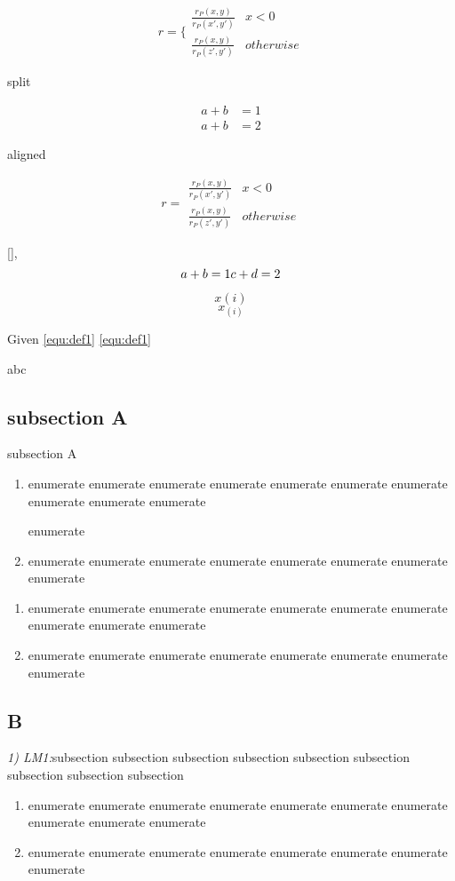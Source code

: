 \documentclass[journal]{IEEEtran}
\begin{document}
\[r=\{ \begin{array}{cc}
      \frac{r_{P}(x,y)}{r_{P}({x}',{y}')} & x<0 \\
      \frac{r_{P}(x,y)}{r_{P}({z}',{y}')} & otherwise
    \end{array}\]
    

split

\[\begin{split}
   a+b&=1 \\
   a+b&=2
\end{split}\]


aligned

\begin{equation}
  r= \begin{aligned}
      \frac{r_{P}(x,y)}{r_{P}({x}',{y}')} & x<0 \\
      \frac{r_{P}(x,y)}{r_{P}({z}',{y}')} & otherwise
    \end{aligned}
\end{equation}


[],
\[ a+b=1 \\ c+d=2 \]

$$ x(i) $$
$$ x_{(i)} $$

Given \eqref{equ:def1} \eqref{equ:def1}

abc\cite{IEEEhowto:IEEEtranpage,IEEEexample:shellCTANpage,IEEEexample:IEEEwebsite}

\subsection{subsection A}
subsection A
\begin{enumerate}
    \item enumerate enumerate enumerate enumerate enumerate enumerate enumerate enumerate enumerate enumerate

        enumerate
    \item enumerate enumerate enumerate enumerate enumerate enumerate enumerate  enumerate
\end{enumerate}

\begin{enumerate}[itemindent=2em]
    \item enumerate enumerate enumerate enumerate enumerate enumerate enumerate enumerate enumerate enumerate
    \item enumerate enumerate enumerate enumerate enumerate enumerate enumerate  enumerate
\end{enumerate}

\subsection{B}
    \emph{1) LM1:}subsection subsection subsection subsection subsection subsection subsection subsection subsection
\begin{enumerate}[itemindent=2em]
    \item enumerate enumerate enumerate enumerate enumerate enumerate enumerate enumerate enumerate enumerate
    \item enumerate enumerate enumerate enumerate enumerate enumerate enumerate  enumerate
\end{enumerate}
\end{document}
